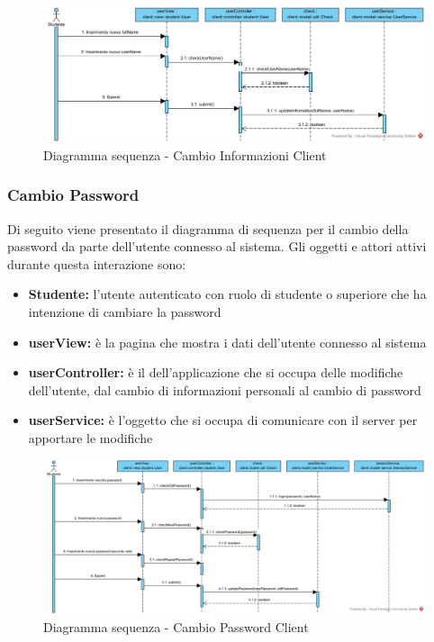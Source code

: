 \documentclass[12pt,a4paper]{article}
\begin{document}
\begin{center}
	\begin{figure}[H]
		\centering \includegraphics[max width=\myheight, angle=90]{../img/diagrammiSequenza/cambioInfoClient.png}
		\caption{Diagramma sequenza - Cambio Informazioni Client}
	\end{figure}
\end{center}

\newpage
\subsubsection{Cambio Password}
Di seguito viene presentato il diagramma di sequenza per il cambio della password da parte dell'utente connesso al sistema. Gli oggetti e attori attivi durante questa interazione sono:

\begin{itemize}
	\item \textbf{Studente:}	 l'utente autenticato con ruolo di studente o superiore che ha intenzione di cambiare la password
	\item \textbf{userView:} è la pagina che mostra i dati dell'utente connesso al sistema
	\item \textbf{userController:} è il  dell'applicazione che si occupa delle modifiche dell'utente, dal cambio di informazioni personali al cambio di password
	\item \textbf{userService:} è l'oggetto che si occupa di comunicare con il server per apportare le modifiche
\end{itemize}

\begin{center}
	\begin{figure}[H]
		\centering \includegraphics[max width=\myheight, angle=90]{../img/diagrammiSequenza/cambioPasswordClient.png}
		\caption{Diagramma sequenza - Cambio Password Client}
	\end{figure}
\end{center}
\end{document}
